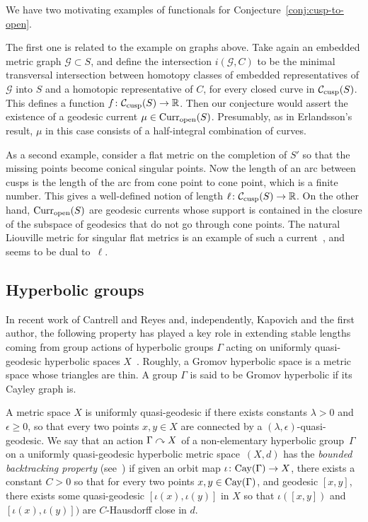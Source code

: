We have two motivating examples of functionals for
Conjecture~\ref{conj:cusp-to-open}.

The first one is related to the example on graphs above. Take again an
embedded metric graph $\mathcal{G} \subset S$, and define the
intersection $i(\mathcal{G},C)$ to be the minimal transversal
intersection between homotopy classes of embedded representatives of
$\mathcal{G}$ into $S$ and a homotopic representative of $C$, for
every closed curve in $\mathcal{C}_{\mathrm{cusp}}(S)$. This defines a
function $f \colon \mathcal{C}_{\mathrm{cusp}}(S) \to \mathbb{R}$. Then
our conjecture would assert the existence of a geodesic current
$\mu \in \operatorname{Curr}_{\mathrm{open}}(S)$. Presumably, as in Erlandsson's
result, $\mu$ in this case consists of a half-integral combination of
curves.

As a second example, consider a flat metric on the completion of $S'$ so that the missing points become conical singular points. Now the length of an arc between cusps is the length of the arc from cone point to cone point, which is a finite number.
This gives a well-defined notion of length $\ell \colon \mathcal{C}_{\mathrm{cusp}}(S) \to \mathbb{R}$.
On the other hand,  $\operatorname{Curr}_{\mathrm{open}}(S)$ are geodesic currents
whose support is contained in the closure of the subspace of geodesics
that do not go through cone points. The natural Liouville metric for
singular flat metrics is an example of such a
current~\cite[Section~3.2]{BL17:RigidityFlat},
and seems to be dual
to~$\ell$.


\subsection{Hyperbolic groups}
In recent work of Cantrell and Reyes and, independently, Kapovich and the first author, the following property has played a key role in extending stable lengths coming from group actions of hyperbolic groups $\Gamma$ acting on uniformly quasi-geodesic hyperbolic spaces $X$~\cite{KMG:BBP,CR25:Manhattan, CMGR26:GreenMetrics}.
Roughly, a Gromov hyperbolic space is a metric space whose triangles are thin. A group $\Gamma$ is said to be Gromov hyperbolic if its Cayley graph is.

A metric space $X$ is uniformly quasi-geodesic if there exists
constants $\lambda >0$ and $\epsilon \geq 0$, so that
every two points $x, y \in X$ are connected by a
$(\lambda,\epsilon)$-quasi-geodesic. We say that an action
$\Gamma \curvearrowright X$ of a non-elementary hyperbolic group~$\Gamma$ on a uniformly
quasi-geodesic hyperbolic metric space~$(X,d)$ has the \emph{bounded
  backtracking property} (see~\cite[Section~6.1]{CR25:Manhattan}) if given an orbit map
$\iota \colon \mathrm{Cay}(\Gamma) \to X$, there exists a constant $C>0$ so that
for every two points $x,y \in \mathrm{Cay}(\Gamma)$, and geodesic $[x,y]$,
there exists some quasi-geodesic $[\iota(x),\iota(y)]$ in $X$ so that
$\iota([x,y])$ and $[\iota(x),\iota(y)])$ are $C$-Hausdorff close in $d$.

